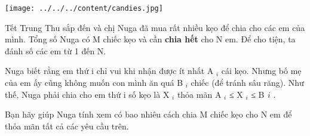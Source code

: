 \texttt{[image: ../../../content/candies.jpg]}

   Tết Trung Thu sắp đến và chị Nuga đã mua rất nhiều kẹo để chia cho các em của mình. Tổng số Nuga có M chiếc kẹo và cần   \textbf{    chia hết   }   cho N em. Để cho tiện, ta đánh số các em từ 1 đến N.  

   Nuga biết rằng em thứ i chỉ vui khi nhận được ít nhất A   $_    i   $   cái kẹo. Nhưng bố mẹ của em ấy cũng không muốn con mình ăn quá B   $_    i   $   chiếc (để tránh sâu răng). Như thế, Nuga phải chia cho em thứ i số kẹo là X   $_    i   $   thỏa mãn A   $_    i   $   ≤ X   $_    i   $   ≤ B   $_    ­i   $   .  

   Bạn hãy giúp Nuga tính xem có bao nhiêu cách chia M chiếc kẹo cho N em để thỏa mãn tất cả các yêu cầu trên.